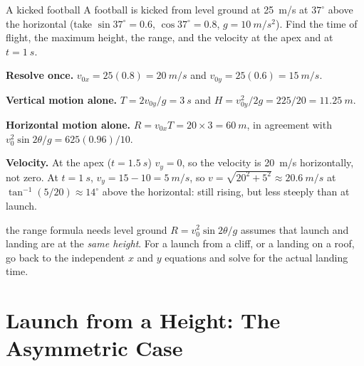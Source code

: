 \begin{exbox}{A kicked football}
A football is kicked from level ground at \SI{25}{m/s} at $37^\circ$ above the horizontal (take
$\sin37^\circ=0.6$, $\cos37^\circ=0.8$, $g=\SI{10}{m/s^2}$). Find the time of flight, the maximum height,
the range, and the velocity at the apex and at $t=\SI{1}{s}$.

 \textbf{Resolve once.} $v_{0x}=25(0.8)=\SI{20}{m/s}$ and $v_{0y}=25(0.6)=\SI{15}{m/s}$.

 \textbf{Vertical motion alone.} $T=2v_{0y}/g=\SI{3}{s}$ and $H=v_{0y}^2/2g=225/20=\SI{11.25}{m}$.

 \textbf{Horizontal motion alone.} $R=v_{0x}T=20\times3=\SI{60}{m}$, in agreement with
$v_0^2\sin2\theta/g=625(0.96)/10$.

 \textbf{Velocity.} At the apex ($t=\SI{1.5}{s}$) $v_y=0$, so the velocity is \SI{20}{m/s}
horizontally, not zero. At $t=\SI{1}{s}$, $v_y=15-10=\SI{5}{m/s}$, so $v=\sqrt{20^2+5^2}\approx\SI{20.6}{m/s}$
at $\tan^{-1}(5/20)\approx14^\circ$ above the horizontal: still rising, but less steeply than at launch.
\end{exbox}


\begin{trapbox}{the range formula needs level ground}
$R=v_0^2\sin2\theta/g$ assumes that launch and landing are at the \emph{same height}. For a launch from
a cliff, or a landing on a roof, go back to the independent $x$ and $y$ equations and solve for the
actual landing time.
\end{trapbox}

\section{Launch from a Height: The Asymmetric Case}

